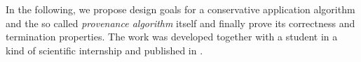 In the following, we propose design goals for a conservative application algorithm and the so called \emph{provenance algorithm} itself and finally prove its correctness and termination properties.
The work was developed together with a student in a kind of scientific internship and published in \cite{gleitze2020orchestration}.






